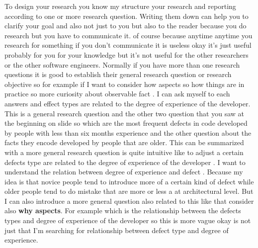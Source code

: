 \documentclass[conference, compsoc, twoside]{IEEEtran}
\begin{document}
To design your research you know my structure your research and reporting according to one or more research question.
Writing them down can help you to clarify your goal and also not just to you but also to the reader because you do research but you have to communicate it.
of course because anytime anytime you research for something if you don't communicate it is useless okay it's just useful probably for you for your knowledge but it's not useful for the other researchers or the other software engineers. 
Normally if you have more than one research questions it is good to establish their general research question or research objective so for example if I want to consider how aspects so how things are in practice so more curiosity about observable fact .
I can ask myself to each answers and effect types are related to the degree of experience of the developer.
This is a general research question and the other two question that you saw at the beginning on slide so which are the most frequent defects in code developed by people with less than six months experience and the other question about the facts they encode developed by people that are older.
This can be summarized with a more general research question is quite intuitive like to adjust a certain defects type are related to the degree of experience of the developer .
I want to understand the relation between degree of experience and defect .
Because my idea is that novice people tend to introduce more of a certain kind of defect while older people tend to do mistake that are more or less a at architectural level. 
But I can also introduce a more general question also related to this like that consider also \textbf{why aspects}. For example which is the relationship between the defects types and degree of experience of the developer so this is more vague okay is not just that I'm searching for relationship between defect type and degree of experience. 
\end{document}
